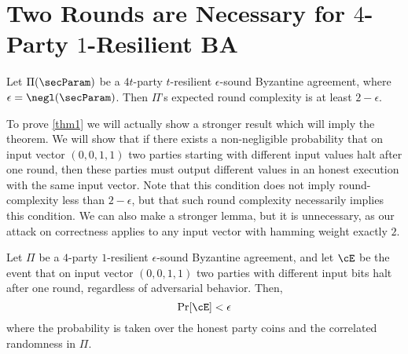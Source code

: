 \section{Two Rounds are Necessary for \texorpdfstring{$4$}{Lg}-Party \texorpdfstring{$1$}{Lg}-Resilient BA}

\begin{theorem} \label{thm1}
	Let $\Pi(\secParam)$ be a $4t$-party $t$-resilient $\epsilon$-sound Byzantine agreement, where $\epsilon = \negl(\secParam)$. Then $\Pi$'s expected round complexity is at least $2 - \epsilon$.
\end{theorem}

To prove \cref{thm1} we will actually show a stronger result which will imply the theorem. We will show that if there exists a non-negligible probability that on input vector $(0,0,1,1)$ two parties starting with different input values halt after one round, then these parties must output different values in an honest execution with the same input vector. Note that this condition does not imply round-complexity less than $2 - \epsilon$, but that such round complexity necessarily implies this condition. We can also make a stronger lemma, but it is unnecessary, as our attack on correctness applies to any input vector with hamming weight exactly $2$.


\begin{lemma}\label{lemma1}
	Let $\Pi$ be a $4$-party $1$-resilient $\epsilon$-sound Byzantine agreement, and let $\cE$ be the event that on input vector $(0,0,1,1)$ two parties with different input bits halt after one round, regardless of adversarial behavior. Then,
	\[
	\Pr[\cE] < \epsilon
	\]
	where the probability is taken over the honest party coins and the correlated randomness in $\Pi$.
\end{lemma}

